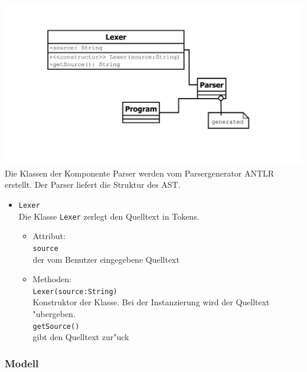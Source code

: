 \documentclass[10pt,a4paper,titlepage]{article}
\begin{document}
\includegraphics[scale=0.5]{images/Parser.pdf} \\
Die Klassen der Komponente Parser werden vom Parsergenerator ANTLR erstellt. Der Parser liefert die Struktur des AST. 
\begin{itemize}
\item \texttt{Lexer} \\
Die Klasse \texttt{Lexer} zerlegt den Quelltext in Tokens. 
\begin{itemize}
\item Attribut: \\
\texttt{source} \\
der vom Benutzer eingegebene Quelltext 
\item Methoden: \\
\texttt{Lexer(source:String)} \\
Konstruktor der Klasse. Bei der Instanzierung wird der Quelltext "ubergeben. \\
\texttt{getSource()} \\
gibt den Quelltext zur"uck \\
\end{itemize}
\end{itemize}

\subsubsection{Modell}
\end{document}
